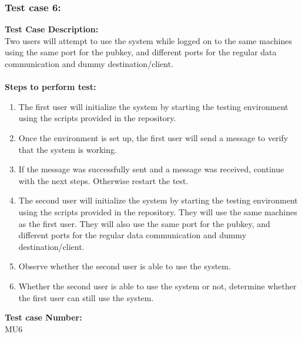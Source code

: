 \documentclass{article}
\begin{document}
\subsubsection{Test case 6: }
\textbf{Test Case Description:\\} Two users will attempt to use the system while logged on to the same machines using the same port for the pubkey, and different ports for the regular data communication and dummy destination/client.\\\\
\textbf{Steps to perform test: } 
\begin{enumerate}
    \item The first user will initialize the system by starting the testing environment using the scripts provided in the repository.
    \item Once the environment is set up, the first user will send a message to verify that the system is working.
    \item If the message was successfully sent and a message was received, continue with the next steps. Otherwise restart the test.
    \item The second user will initialize the system by starting the testing environment using the scripts provided in the repository. They will use the same machines as the first user. They will also use the same port for the pubkey, and different ports for the regular data communication and dummy destination/client.
    \item Observe whether the second user is able to use the system.
    \item Whether the second user is able to use the system or not, determine whether the first user can still use the system.
\end{enumerate}
\textbf{Test case Number: \\} MU6
\end{document}
